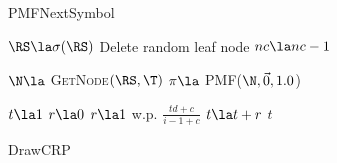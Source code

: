 \begin{figure*}[ttt!]
	\begin{minipage}[t]{.48\linewidth}
		\begin{algorithm}[H]
			\caption{PMFNextSymbol} \label{alg:pmfnextsymbol}
	\begin{algorithmic}[1]
			\State $\RS \la \sigma(\RS)$
		\EndWhile
			\State Delete random leaf node
			\State $nc \la nc -1$
		\EndWhile
		
		\State $\N \la$ \textsc{GetNode}$(\RS, \T)$
		\State $\pi \la$ \textsc{PMF}($\N, \vec 0, 1.0$) 
		\State \Return [$\pi$, \N]
	\EndFunction
	 \end{algorithmic}
\end{algorithm}
\vspace{-.75cm}
\begin{algorithm}[H]
	\caption{DrawCRP} \label{alg:drawcrp}
	\begin{algorithmic}[1]

	
	 
		\State $t \la 1$
			\State $r \la 0$
			\State $r  \la 1$ w.p. $\frac{td + c}{i-1 + c}$
			\State $t \la t + r$
		\EndFor
		\State \Return $t$
	\EndFunction
	

\end{algorithmic}
\end{algorithm}
\end{minipage}
\end{figure*}
